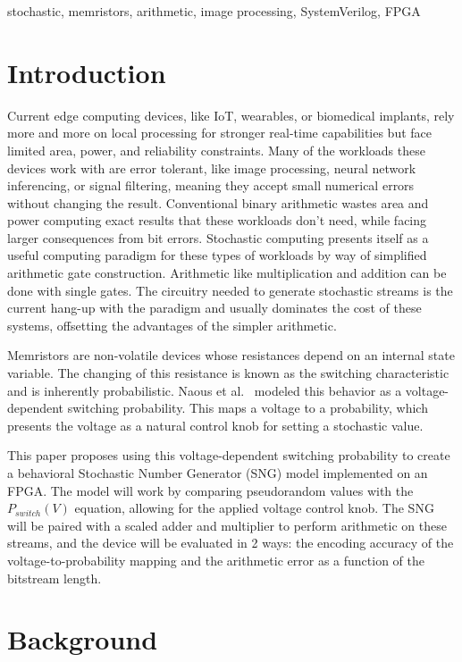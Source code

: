 \documentclass[conference]{IEEEtran}
\begin{document}
\begin{IEEEkeywords}
stochastic, memristors, arithmetic, image processing, SystemVerilog, FPGA
\end{IEEEkeywords}

\section{Introduction}
Current edge computing devices, like IoT, wearables, or biomedical implants, rely
more and more on local processing for stronger real-time capabilities but face
limited area, power, and reliability constraints. Many of the workloads these devices work
with are error tolerant, like image processing, neural network inferencing, or
signal filtering, meaning they accept small numerical errors without changing the result.
Conventional binary arithmetic wastes area and power computing exact results that
these workloads don't need, while facing larger consequences from bit errors.
Stochastic computing presents itself as a useful computing paradigm for these types of workloads
by way of simplified arithmetic gate construction. Arithmetic like multiplication and
addition can be done with single gates. The circuitry needed to generate stochastic
streams is the current hang-up with the paradigm and usually dominates the cost of these
systems, offsetting the advantages of the simpler arithmetic.

Memristors are non-volatile devices whose resistances depend on an internal state variable.
The changing of this resistance is known as the switching characteristic and is
inherently probabilistic. Naous et al.~\cite{memristor_stochasticity} modeled this
behavior as a voltage-dependent switching probability. This maps a voltage to a 
probability, which presents the voltage as a natural control knob for setting a 
stochastic value.

This paper proposes using this voltage-dependent switching probability to create a
behavioral Stochastic Number Generator (SNG) model implemented on an FPGA.
The model will work by comparing pseudorandom
values with the $P_{switch}(V)$ equation, allowing for the applied voltage control knob.
The SNG will be paired with a scaled adder and multiplier to perform arithmetic on
these streams, and the device will be evaluated in 2 ways: the encoding accuracy of the
voltage-to-probability mapping and the arithmetic error as a function of the
bitstream length.

\section{Background}
\end{document}
